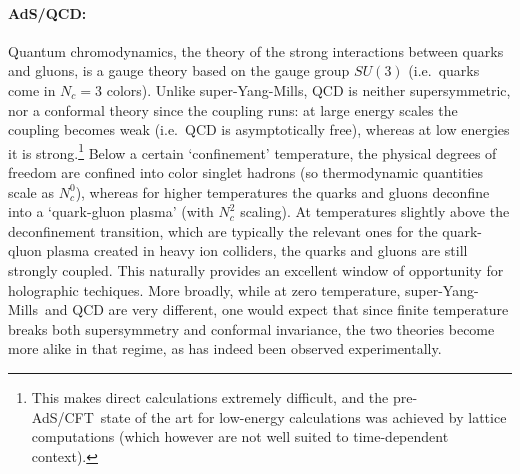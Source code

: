 \documentclass[12pt,a4paper]{article}
\def\AC{AdS/CFT}
\def\SYM{super-Yang-Mills}
\begin{document}
\paragraph{AdS/QCD:}  %
Quantum chromodynamics, the theory of the strong interactions between quarks and gluons, is a gauge theory based on the gauge group $SU(3)$ (i.e.\ quarks come in $N_c =3$ colors).  Unlike \SYM, QCD is neither supersymmetric, nor a conformal theory since the coupling runs: at large energy scales the coupling becomes weak (i.e.\ QCD is asymptotically free), whereas at low energies it is strong.\footnote{
This makes direct calculations extremely difficult, and the pre-\AC\ state of the art for low-energy calculations was achieved by lattice computations (which however are not well suited to time-dependent context).
}  Below a certain  `confinement' temperature, the physical degrees of freedom are confined into color singlet hadrons (so thermodynamic quantities scale as $N_c^0$), whereas for higher temperatures the quarks and gluons deconfine into a `quark-gluon plasma' (with $N_c^2$ scaling).  At temperatures slightly above the deconfinement transition, which are typically the relevant ones for the quark-qluon plasma created in heavy ion colliders, the quarks and gluons are still strongly coupled. This naturally provides an excellent window of opportunity for holographic techiques.
    More broadly,  while at zero temperature, \SYM\ and QCD are very different, one would expect that since finite temperature breaks both supersymmetry and conformal invariance,  the two theories become more alike in that regime, as has indeed been observed experimentally.
\end{document}
